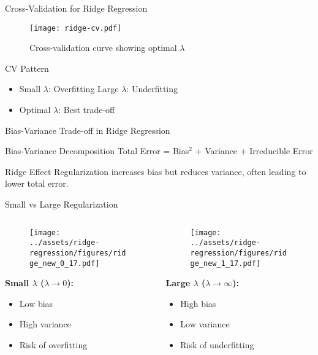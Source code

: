 \documentclass{beamer}
\begin{document}
\begin{frame}{Cross-Validation for Ridge Regression}
\begin{figure}
\centering
\texttt{[image: ridge-cv.pdf]}
\caption{{\small Cross-validation curve showing optimal $\lambda$}}
\end{figure}

\vspace{-0.1cm}
\begin{keypointsbox}{CV Pattern}
{\small 
\begin{itemize}
\item Small $\lambda$: Overfitting  \quad Large $\lambda$: Underfitting
\item Optimal $\lambda$: Best trade-off
\end{itemize}
}
\end{keypointsbox}
\end{frame}

\begin{frame}{Bias-Variance Trade-off in Ridge Regression}
\begin{theorembox}{Bias-Variance Decomposition}
Total Error = Bias$^2$ + Variance + Irreducible Error
\end{theorembox}
\pause

\begin{keypointsbox}{Ridge Effect}
Regularization increases bias but reduces variance, often leading to lower total error.
\end{keypointsbox}
\end{frame}

\begin{frame}{Small vs Large Regularization}
\begin{columns}
\begin{column}{0.48\textwidth}
\begin{figure}
\texttt{[image: ../assets/ridge-regression/figures/ridge\_new\_0\_17.pdf]}
\end{figure}
\textbf{Small $\lambda$ ($\lambda \to 0$):}
\begin{itemize}
\item Low bias
\item High variance
\item Risk of overfitting
\end{itemize}
\end{column}
\begin{column}{0.48\textwidth}
\begin{figure}
\texttt{[image: ../assets/ridge-regression/figures/ridge\_new\_1\_17.pdf]}
\end{figure}
\textbf{Large $\lambda$ ($\lambda \to \infty$):}
\begin{itemize}
\item High bias
\item Low variance  
\item Risk of underfitting
\end{itemize}
\end{column}
\end{columns}
\end{frame}
\end{document}
